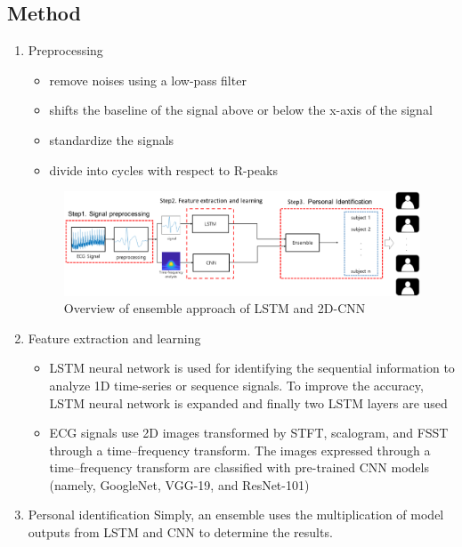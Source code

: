 \documentclass[dvipdfmx]{article}
\begin{document}
\subsection{Method}
\begin{enumerate}
    \item Preprocessing
    \begin{itemize}
        \item remove noises using a low-pass filter
        \item shifts the baseline of the signal above or below the x-axis of the signal
        \item standardize the signals
        \item divide into cycles with respect to R-peaks
    \end{itemize}

    \begin{figure}[H]
        \begin{center}
        \includegraphics[width=\linewidth]{./img/LSTM-CNN.png}
        \end{center}
        \caption{Overview of ensemble approach of LSTM and 2D-CNN}
    \end{figure}

    \item Feature extraction and learning
    \begin{itemize}
        \item LSTM neural network is used for identifying the sequential information to analyze 1D time-series or sequence signals. To improve the accuracy, LSTM neural network is expanded and finally two LSTM layers are used
        \item ECG signals use 2D images transformed by STFT, scalogram, and FSST through a time–frequency transform. The images expressed through a time–frequency transform are classified with pre-trained CNN models (namely, GoogleNet, VGG-19, and ResNet-101) 
    \end{itemize}
    \item Personal identification \newline
    Simply, an ensemble uses the multiplication of model outputs from LSTM and CNN to determine the results.
\end{enumerate}
\end{document}
